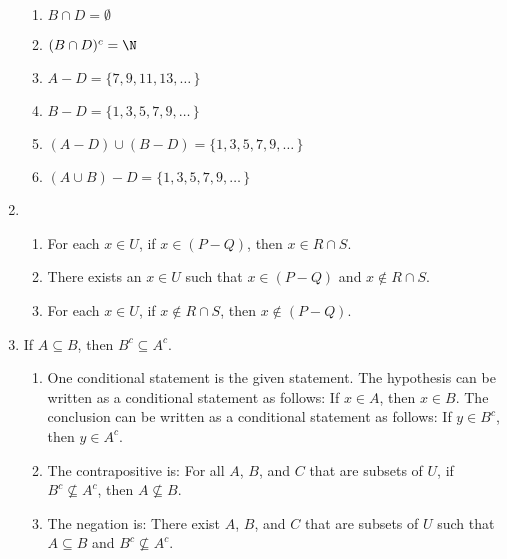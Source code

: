 \begin{enumerate}
\begin{enumerate}
\item $B \cap D = \emptyset$

\item $(B \cap D)^c = \N$

\item $A - D = \{7, 9, 11, 13, \ldots \, \}$

\item $B - D = \{1, 3, 5, 7, 9, \ldots \, \}$

\item $(A - D) \cup (B - D) = \{1, 3, 5, 7, 9, \ldots \, \}$

\item $(A \cup B) - D = \{1, 3, 5, 7, 9, \ldots \, \}$
\end{enumerate}





\item \begin{enumerate}
\item For each $x \in U$, if $x \in \left( P - Q \right)$, then $x \in R \cap S$.

\item There exists an $x \in U$ such that $x \in \left( P - Q \right)$ and $x \notin R \cap S$.

\item For each $x \in U$, if $x \notin R \cap S$, then $x \notin \left( P - Q \right)$.
\end{enumerate}



\item If $A \subseteq B$, then $B^c \subseteq A^c$.
\begin{enumerate}
\item One conditional statement is the given statement.  The hypothesis can be written as a conditional statement as follows:  If $x \in A$, then $x \in B$.  The conclusion can be written as a conditional statement as follows:  If $y \in B^c$, then $y \in A^c$.

\item The contrapositive is:  For all $A$, $B$, and $C$ that are subsets of $U$, if $B^c \not \subseteq A^c$, then $A \not \subseteq B$.

\item The negation is:   There exist $A$, $B$, and $C$ that are subsets of $U$ such that $A \subseteq B$ and $B^c \not \subseteq A^c$.



%
%
\end{enumerate}




\end{enumerate}
